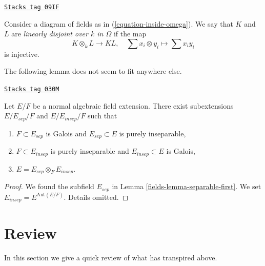 \begin{definition}
\label{fields-definition-linearly-disjoint}
\href{https://stacks.math.columbia.edu/tag/09IF}{\texttt{Stacks tag 09IF}}

Consider a diagram of fields as in (\ref{equation-inside-omega}).
We say that $K$ and $L$ are {\it linearly disjoint over $k$ in $\Omega$}
if the map
$$
K \otimes_k L \longrightarrow KL,\quad
\sum x_i \otimes y_i \longmapsto \sum x_i y_i
$$
is injective.
\end{definition}

The following lemma does not seem to fit anywhere else.

\begin{lemma}
\label{fields-lemma-normal-case}
\href{https://stacks.math.columbia.edu/tag/030M}{\texttt{Stacks tag 030M}}

Let $E/F$ be a normal algebraic field extension. There exist subextensions
$E / E_{sep} /F$ and $E / E_{insep} / F$ such that
\begin{enumerate}
\item $F \subset E_{sep}$ is Galois and $E_{sep} \subset E$
is purely inseparable,
\item $F \subset E_{insep}$ is purely inseparable and $E_{insep} \subset E$
is Galois,
\item $E = E_{sep} \otimes_F E_{insep}$.
\end{enumerate}
\end{lemma}

\begin{proof}

We found the subfield $E_{sep}$ in Lemma \ref{fields-lemma-separable-first}.
We set $E_{insep} = E^{\text{Aut}(E/F)}$. Details omitted.
\end{proof}

\section{Review}
\label{fields-section-algebraic}
In this section we give a quick review of what has transpired above.

